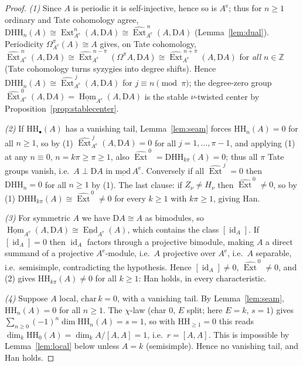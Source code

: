 \documentclass[11pt]{amsart}
\theoremstyle{definition}
\newcommand{\HH}{\mathrm{HH}}
\newcommand{\D}{\mathrm{D}}
\newcommand{\Ext}{\operatorname{Ext}}
\newcommand{\sExt}{\widehat{\operatorname{Ext}}}
\newcommand{\sHom}{\underline{\operatorname{Hom}}}
\newcommand{\sEnd}{\underline{\operatorname{End}}}
\newcommand{\id}{\operatorname{id}}
\newcommand{\Ae}{A^{\mathrm{e}}}
\newcommand{\kk}{k}
\newcommand{\Z}{\mathbb{Z}}
\begin{document}
\begin{proof}
\emph{(1)} Since $A$ is periodic it is self-injective, hence so is $\Ae$; thus
for $n\ge1$ ordinary and Tate cohomology agree,
$\D\HH_n(A)\cong\Ext^n_{\Ae}(A,\D A)\cong\sExt^{\,n}_{\Ae}(A,\D A)$
(Lemma~\ref{lem:dual}). Periodicity $\Omega^\pi_{\Ae}(A)\cong A$ gives, on Tate
cohomology, $\sExt^{\,n}_{\Ae}(A,\D A)\cong\sExt^{\,n-\pi}_{\Ae}(\Omega^\pi A,\D A)
\cong\sExt^{\,n+\pi}_{\Ae}(A,\D A)$ for \emph{all} $n\in\Z$ (Tate cohomology
turns syzygies into degree shifts). Hence
$\D\HH_n(A)\cong\sExt^{\,j}_{\Ae}(A,\D A)$ for $j\equiv n\pmod\pi$; the
degree-zero group $\sExt^{\,0}_{\Ae}(A,\D A)=\sHom_{\Ae}(A,\D A)$ is the stable
$\nu$-twisted center by Proposition~\ref{prop:stablecenter}.

\emph{(2)} If $\HH_\bullet(A)$ has a vanishing tail, Lemma~\ref{lem:seam} forces
$\HH_n(A)=0$ for all $n\ge1$, so by (1) $\sExt^{\,j}_{\Ae}(A,\D A)=0$ for all
$j=1,\dots,\pi-1$, and applying (1) at any $n\equiv0$, $n=k\pi\ge\pi\ge1$, also
$\sExt^{\,0}=\D\HH_{k\pi}(A)=0$; thus all $\pi$ Tate groups vanish, i.e.\
$A\perp\D A$ in $\underline{\mathrm{mod}}\,\Ae$. Conversely if all
$\sExt^{\,j}=0$ then $\D\HH_n=0$ for all $n\ge1$ by (1). The last clause: if
$Z_\nu\ne H_\nu$ then $\sExt^{\,0}\ne0$, so by (1) $\D\HH_{k\pi}(A)\cong
\sExt^{\,0}\ne0$ for every $k\ge1$ with $k\pi\ge1$, giving Han.

\emph{(3)} For symmetric $A$ we have $\D A\cong A$ as bimodules, so
$\sHom_{\Ae}(A,\D A)\cong\sEnd_{\Ae}(A)$, which contains the class $[\id_A]$.
If $[\id_A]=0$ then $\id_A$ factors through a projective bimodule, making $A$ a
direct summand of a projective $\Ae$-module, i.e.\ $A$ projective over $\Ae$,
i.e.\ $A$ separable, i.e.\ semisimple, contradicting the hypothesis. Hence
$[\id_A]\ne0$, $\sExt^{\,0}\ne0$, and (2) gives $\HH_{k\pi}(A)\ne0$ for all
$k\ge1$: Han holds, in every characteristic.

\emph{(4)} Suppose $A$ local, $\mathrm{char}\,\kk=0$, with a vanishing tail. By
Lemma~\ref{lem:seam}, $\HH_n(A)=0$ for all $n\ge1$. The $\chi$-law
\cite[Theorem 5.2]{ArmPC} (char $0$, $E$ split; here $E=\kk$, $s=1$) gives
$\sum_{n\ge0}(-1)^n\dim\HH_n(A)=s=1$, so with $\HH_{\ge1}=0$ this reads
$\dim_\kk\HH_0(A)=\dim_\kk A/[A,A]=1$, i.e.\ $r=[A,A]$. This is impossible by
Lemma~\ref{lem:local} below unless $A=\kk$ (semisimple). Hence no vanishing
tail, and Han holds.
\end{proof}

\end{document}
